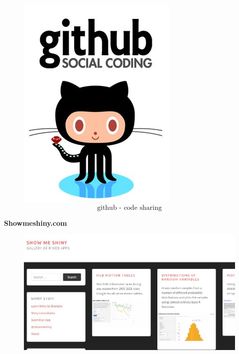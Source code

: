 \documentclass{beamer}
\begin{document}
\begin{frame}
\begin{figure}

\centering
\includegraphics[width=0.55\linewidth]{./github}
\[ \mbox{github - code sharing}  \]
\end{figure}
\Large


\end{frame}

\begin{frame}
\textbf{Showmeshiny.com}
	\begin{figure}
		
		\centering
		\includegraphics[width=0.95\linewidth]{./showmeshiny}
	
	\end{figure}

	
	
\end{frame}
\end{document}
